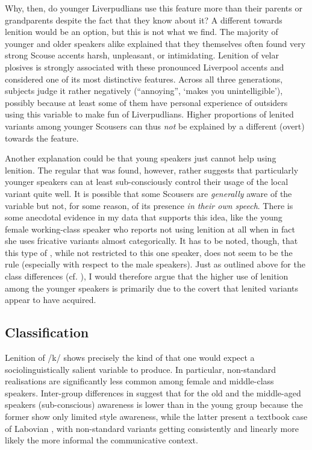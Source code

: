 Why, then, do younger Liverpudlians use this feature more than their parents or grandparents despite the fact that they know about it?
A different  towards lenition would be an option, but this is not what we find.
The majority of younger and older speakers alike explained that they themselves often found very strong Scouse accents harsh, unpleasant, or intimidating.
Lenition of velar plosives is strongly associated with these pronounced Liverpool accents and considered one of its most distinctive features.
Across all three generations, subjects judge it rather negatively (``annoying'', `makes you unintelligible'), possibly because at least some of them have personal experience of outsiders using this variable to make fun of Liverpudlians.
Higher proportions of lenited variants among younger Scousers can thus \emph{not} be explained by a different (overt)  towards the feature.

Another explanation could be that young speakers just cannot help using lenition.
The regular  that was found, however, rather suggests that particularly younger speakers can at least sub-consciously control their usage of the local variant quite well.
It is possible that some Scousers are \emph{generally} aware of the variable but not, for some reason, of its presence \emph{in their own speech}.
There is some anecdotal evidence in my data that supports this idea, like the young female working-class speaker who reports not using lenition at all when in fact she uses fricative variants almost categorically.
It has to be noted, though, that this type of , while not restricted to this one speaker, does not seem to be the rule (especially with respect to the male speakers).
Just as outlined above for the class differences (cf. ), I would therefore argue that the higher use of lenition among the younger speakers is primarily due to the covert  that lenited variants appear to have acquired.

\subsection{Classification}
\label{prod.disc.k.classification}

Lenition of /k/ shows precisely the kind of  that one would expect a sociolinguistically salient variable to produce.
In particular, non-standard realisations are significantly less common among female and middle-class speakers.
Inter-group differences in  suggest that for the old and the mid\-dle-aged speakers (sub-conscious) awareness is lower than in the young group because the former show only limited style awareness, while the latter present a textbook case of Labovian , with non-standard variants getting consistently and linearly more likely the more informal the communicative context.

